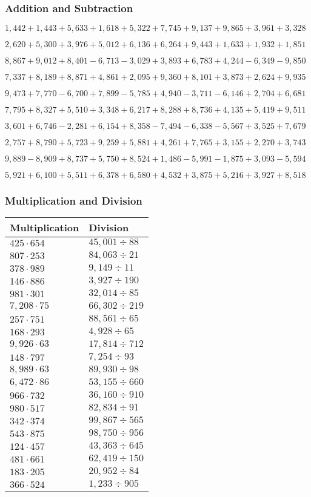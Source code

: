 \hypertarget{addition-and-subtraction-165}{%
\subsubsection{Addition and
Subtraction}\label{addition-and-subtraction-165}}

\(1,442+1,443+5,633+1,618+5,322+7,745+9,137+9,865+3,961+ 3,328\)

\(2,620+5,300+3,976+5,012+6,136+6,264+9,443+1,633+1,932+1,851\)

\(8,867+9,012+8,401-6,713-3,029+3,893+6,783+4,244-6,349-9,850\)

\(7,337+8,189+8,871+4,861+2,095+9,360+8,101+3,873+2,624+9,935\)

\(9,473+7,770-6,700+7,899-5,785+4,940-3,711-6,146+2,704+6,681\)

\(7,795+8,327+5,510+3,348+6,217+8,288+8,736+4,135+5,419+9,511\)

\(3,601+6,746-2,281+6,154+8,358-7,494-6,338-5,567+3,525+7,679\)

\(2,757+8,790+5,723+9,259+5,881+4,261+7,765+3,155+2,270+3,743\)

\(9,889-8,909+8,737+5,750+8,524+1,486-5,991-1,875+3,093-5,594\)

\(5,921+6,100+5,511+6,378+6,580+4,532+3,875+5,216+3,927+8,518\)

\hypertarget{multiplication-and-division-164}{%
\subsubsection{Multiplication and
Division}\label{multiplication-and-division-164}}

\begin{longtable}[]{@{}ll@{}}
\toprule
Multiplication & Division\tabularnewline
\midrule
\endhead
\(425\cdot654\) & \(45,001÷88\)\tabularnewline
\(807\cdot253\) & \(84,063÷21\)\tabularnewline
\(378\cdot989\) & \(9,149÷11\)\tabularnewline
\(146\cdot886\) & \(3,927÷190\)\tabularnewline
\(981\cdot301\) & \(32,014÷85\)\tabularnewline
\(7,208\cdot75\) & \(66,302÷219\)\tabularnewline
\(257\cdot751\) & \(88,561÷65\)\tabularnewline
\(168\cdot293\) & \(4,928÷65\)\tabularnewline
\(9,926\cdot63\) & \(17,814÷712\)\tabularnewline
\(148\cdot797\) & \(7,254÷93\)\tabularnewline
\(8,989\cdot63\) & \(89,930÷98\)\tabularnewline
\(6,472\cdot86\) & \(53,155÷660\)\tabularnewline
\(966\cdot732\) & \(36,160÷910\)\tabularnewline
\(980\cdot517\) & \(82,834÷91\)\tabularnewline
\(342\cdot374\) & \(99,867÷565\)\tabularnewline
\(543\cdot875\) & \(98,750÷956\)\tabularnewline
\(124\cdot457\) & \(43,363÷645\)\tabularnewline
\(481\cdot661\) & \(62,419÷150\)\tabularnewline
\(183\cdot205\) & \(20,952÷84\)\tabularnewline
\(366\cdot524\) & \(1,233÷905\)\tabularnewline
\bottomrule
\end{longtable}

